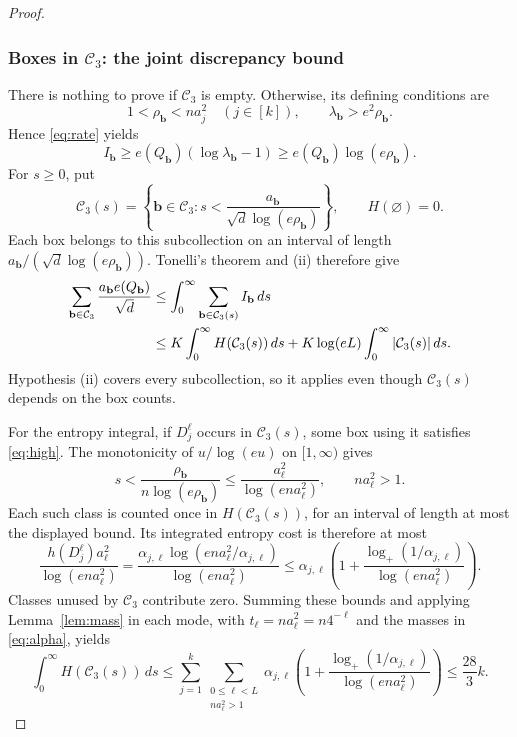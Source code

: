 \documentclass[11pt,reqno]{amsart}
\numberwithin{equation}{section}
\theoremstyle{definition}
\theoremstyle{remark}
\begin{document}
\begin{proof}
\subsubsection*{Boxes in $\mathcal C_3$: the joint discrepancy bound}
There is nothing to prove if $\mathcal C_3$ is empty. Otherwise,
its defining conditions are
\begin{equation}\label{eq:high}
 1<\rho_{\mathbf b}<na_j^2\quad(j\in[k]),\qquad
 \lambda_{\mathbf b}>e^2\rho_{\mathbf b}.
\end{equation}
Hence \eqref{eq:rate} yields
\[
 I_{\mathbf b}\ge e(Q_{\mathbf b})(\log\lambda_{\mathbf b}-1)
               \ge e(Q_{\mathbf b})\log(e\rho_{\mathbf b}).
\]
For $s\ge0$, put
\[
 \mathcal C_3(s)=\left\{\mathbf b\in\mathcal C_3:
        s<\frac{a_{\mathbf b}}{\sqrt d\log(e\rho_{\mathbf b})}\right\},
 \qquad H(\varnothing)=0.
\]
Each box belongs to this subcollection on an interval of length
$a_{\mathbf b}/(\sqrt d\log(e\rho_{\mathbf b}))$.
Tonelli's theorem and \textup{(ii)} therefore give
\begin{align}
 \sum_{\mathbf b\in\mathcal C_3}\frac{a_{\mathbf b}e(Q_{\mathbf b})}{\sqrt d}
 &\le\int_0^\infty\sum_{\mathbf b\in\mathcal C_3(s)}I_{\mathbf b}\,ds
 \notag\\
 &\le K\int_0^\infty H(\mathcal C_3(s))\,ds
       +K\log(eL)\int_0^\infty|\mathcal C_3(s)|\,ds.
 \label{eq:high-integrated}
\end{align}
Hypothesis \textup{(ii)} covers every subcollection, so it applies
even though $\mathcal C_3(s)$ depends on the box counts.

For the entropy integral, if $D_j^\ell$ occurs in $\mathcal C_3(s)$,
some box using it satisfies \eqref{eq:high}. The monotonicity of
$u/\log(eu)$ on $[1,\infty)$ gives
\[
 s<\frac{\rho_{\mathbf b}}{n\log(e\rho_{\mathbf b})}
 \le\frac{a_\ell^2}{\log(en a_\ell^2)},\qquad na_\ell^2>1.
\]
Each such class is counted once in $H(\mathcal C_3(s))$, for an
interval of length at most the displayed bound. Its integrated
entropy cost is therefore at most
\[
 \frac{h(D_j^\ell)a_\ell^2}{\log(en a_\ell^2)}
 =\frac{\alpha_{j,\ell}\log(en a_\ell^2/\alpha_{j,\ell})}
          {\log(en a_\ell^2)}
 \le\alpha_{j,\ell}\left(1+
       \frac{\log_+(1/\alpha_{j,\ell})}{\log(en a_\ell^2)}\right).
\]
Classes unused by $\mathcal C_3$ contribute zero.
Summing these bounds and applying Lemma~\ref{lem:mass} in each mode,
with $t_\ell=na_\ell^2=n4^{-\ell}$ and the masses in \eqref{eq:alpha},
yields
\begin{equation}\label{eq:total-entropy-charge}
 \int_0^\infty H(\mathcal C_3(s))\,ds
 \le\sum_{j=1}^k\sum_{\substack{0\le\ell<L\\na_\ell^2>1}}
       \alpha_{j,\ell}\left(1+
       \frac{\log_+(1/\alpha_{j,\ell})}{\log(en a_\ell^2)}\right)
 \le\frac{28}{3}k.
\end{equation}


\end{proof}
\end{document}
